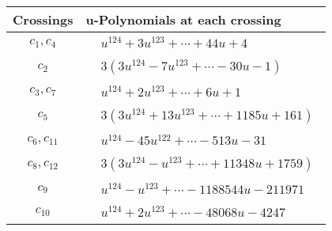 \documentclass[1p]{elsarticle_modified}
\theoremstyle{definition}
\begin{document}
\begin{tabular}{m{50pt}|m{274pt}}
Crossings & \hspace{64pt}u-Polynomials at each crossing \\
\hline $$\begin{aligned}c_{1},c_{4}\end{aligned}$$&$\begin{aligned}
&u^{124}+3 u^{123}+\cdots+44 u+4
\end{aligned}$\\
\hline $$\begin{aligned}c_{2}\end{aligned}$$&$\begin{aligned}
&3(3 u^{124}-7 u^{123}+\cdots-30 u-1)
\end{aligned}$\\
\hline $$\begin{aligned}c_{3},c_{7}\end{aligned}$$&$\begin{aligned}
&u^{124}+2 u^{123}+\cdots+6 u+1
\end{aligned}$\\
\hline $$\begin{aligned}c_{5}\end{aligned}$$&$\begin{aligned}
&3(3 u^{124}+13 u^{123}+\cdots+1185 u+161)
\end{aligned}$\\
\hline $$\begin{aligned}c_{6},c_{11}\end{aligned}$$&$\begin{aligned}
&u^{124}-45 u^{122}+\cdots-513 u-31
\end{aligned}$\\
\hline $$\begin{aligned}c_{8},c_{12}\end{aligned}$$&$\begin{aligned}
&3(3 u^{124}- u^{123}+\cdots+11348 u+1759)
\end{aligned}$\\
\hline $$\begin{aligned}c_{9}\end{aligned}$$&$\begin{aligned}
&u^{124}- u^{123}+\cdots-1188544 u-211971
\end{aligned}$\\
\hline $$\begin{aligned}c_{10}\end{aligned}$$&$\begin{aligned}
&u^{124}+2 u^{123}+\cdots-48068 u-4247
\end{aligned}$\\
\hline
\end{tabular}\\~\\
\end{document}
